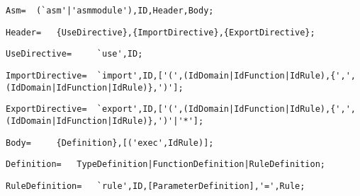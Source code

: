 \documentclass{article}
\begin{document}
    \begin{flushleft}
    \begin{lstlisting}[mathescape=true, breaklines=true]
      Asm= 	(`asm'|'asmmodule'),ID,Header,Body;
    \end{lstlisting}
    \end{flushleft}
    \begin{flushleft}
    \begin{lstlisting}[mathescape=true, breaklines=true]
      Header= 	{UseDirective},{ImportDirective},{ExportDirective};
    \end{lstlisting}
    \end{flushleft}
    \begin{flushleft}
    \begin{lstlisting}[mathescape=true, breaklines=true]
      UseDirective= 	`use',ID;
    \end{lstlisting}
    \end{flushleft}
    \begin{flushleft}
    \begin{lstlisting}[mathescape=true, breaklines=true]
      ImportDirective= 	`import',ID,['(',(IdDomain|IdFunction|IdRule),{',',(IdDomain|IdFunction|IdRule)},')'];
    \end{lstlisting}
    \end{flushleft}
    \begin{flushleft}
    \begin{lstlisting}[mathescape=true, breaklines=true]
      ExportDirective= 	`export',ID,['(',(IdDomain|IdFunction|IdRule),{',',(IdDomain|IdFunction|IdRule)},')'|'*'];
    \end{lstlisting}
    \end{flushleft}
    \begin{flushleft}
    \begin{lstlisting}[mathescape=true, breaklines=true]
      Body= 	{Definition},[('exec',IdRule)];
    \end{lstlisting}
    \end{flushleft}
    \begin{flushleft}
    \begin{lstlisting}[mathescape=true, breaklines=true]
      Definition= 	TypeDefinition|FunctionDefinition|RuleDefinition;
    \end{lstlisting}
    \end{flushleft}
    \begin{flushleft}
    \begin{lstlisting}[mathescape=true, breaklines=true]
      RuleDefinition= 	`rule',ID,[ParameterDefinition],'=',Rule;
    \end{lstlisting}
    \end{flushleft}
\end{document}

